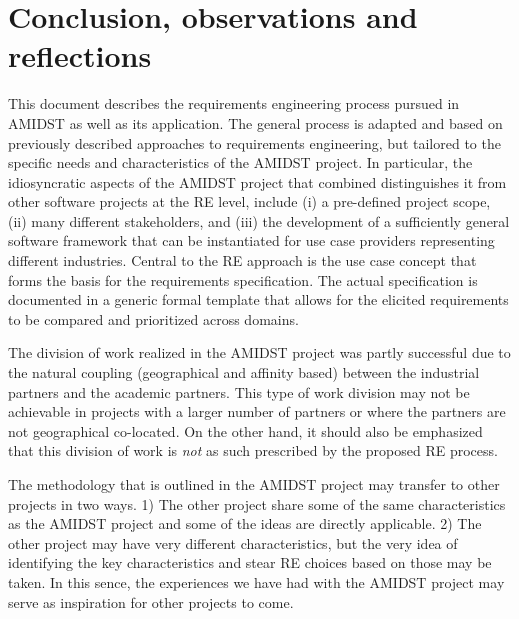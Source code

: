 \section{Conclusion, observations and reflections} 
\label{sec:conclusion}

This document describes the requirements engineering process pursued in AMIDST as well as its application. The general process is  adapted and based
on previously described approaches to requirements engineering, but tailored to the specific needs and characteristics of the AMIDST
project. In particular, the idiosyncratic aspects of the AMIDST project that combined distinguishes it from other software
projects at the RE level, include (i) a pre-defined project scope, (ii) many different
stakeholders, and (iii) the development of a sufficiently general software framework that can be instantiated for
use case providers representing different industries.  Central to the RE approach is the use case
concept that forms the basis for the requirements specification. The actual specification is documented in a generic
formal template that allows for the elicited requirements to be compared and prioritized across domains. 

The division of work realized in the AMIDST project was partly successful due to the natural coupling (geographical and
affinity based) between the industrial partners and the academic partners. This type of work division may not be
achievable in projects with a larger number of partners or where the partners are not geographical co-located. On the
other hand, it should also be emphasized that this division of work is \emph{not} as such prescribed by the proposed
RE process. 

The methodology that is outlined in the AMIDST project may transfer to other projects in two ways.  1) The other project share some of the same characteristics as the AMIDST project and some of the ideas are directly applicable. 2) The other project may have very different characteristics, but the very idea of identifying the key characteristics and stear RE choices based on those may be taken.  In this sence, the experiences we have had with the AMIDST project may serve as inspiration for other projects to come.
